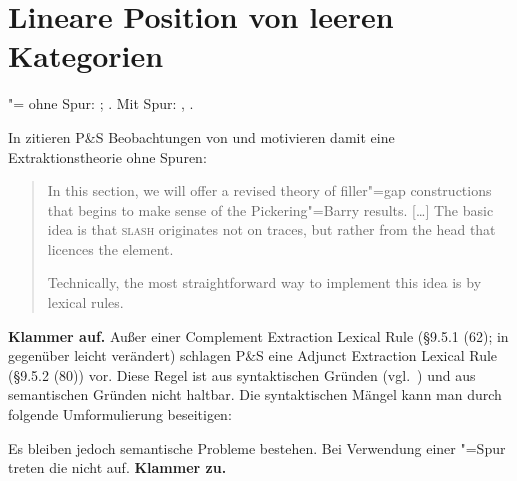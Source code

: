 \documentclass[output=paper]{LSP/langsci}
\begin{document}
\section{Lineare Position von leeren Kategorien}

{\randnum}"= ohne Spur: \citet{pollard1985a,pollard1988a}; \citet{Cooper1990}. Mit Spur: \citet{PollardSag1987}, \citet[Kapitel 4--6]{PollardSag1992}.

\randnum\label{rn:16-13}In \cite[Kapitel 9.5.1]{PollardSag1992}
zitieren P\&S Beobachtungen von \citet{PickeringBarry1991} und motivieren damit eine
Extraktionstheorie ohne Spuren:
\begin{quotation}
  In this section, we will offer a revised theory of filler"=gap
  constructions that begins to make sense of the Pickering"=Barry
  results. [\ldots{}] The basic idea is that \textsc{slash} originates not
  on traces, but rather from the head that licences the
   element.

  Technically, the most straightforward way to implement this idea is
  by lexical rules.
\end{quotation}
{\randnum}\textbf{Klammer auf.} Außer einer
Complement Extraction Lexical Rule (§9.5.1 (62); in \citealt{PollardSag1992iE} gegenüber
\citealt{PollardSag1992} leicht verändert) schlagen P\&S eine Adjunct Extraction Lexical
Rule (§9.5.2 (80)) vor. Diese Regel ist aus syntaktischen Gründen
(vgl.\ \citealt{Hukari1993}) und aus semantischen Gründen nicht haltbar. Die
syntaktischen Mängel kann man durch folgende Umformulierung
beseitigen:
\begin{exe}
\ex
{}
\end{exe}
{\randnum}Es bleiben jedoch semantische Probleme
bestehen. Bei Verwendung einer "=Spur treten die nicht
auf. \textbf{Klammer zu.}
\end{document}
